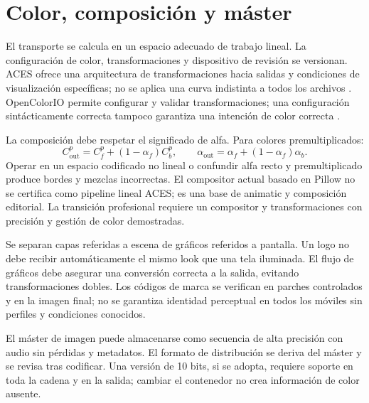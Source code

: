 \section{Color, composición y máster}
El transporte se calcula en un espacio adecuado de trabajo lineal. La configuración de color, transformaciones y dispositivo de revisión se versionan. ACES ofrece una arquitectura de transformaciones hacia salidas y condiciones de visualización específicas; no se aplica una curva indistinta a todos los archivos \cite{aces}. OpenColorIO permite configurar y validar transformaciones; una configuración sintácticamente correcta tampoco garantiza una intención de color correcta \cite{ocio}.

La composición debe respetar el significado de alfa. Para colores premultiplicados:
\begin{equation}
 C_{\mathrm{out}}^{p}=C_f^{p}+(1-\alpha_f)C_b^{p},\qquad
 \alpha_{\mathrm{out}}=\alpha_f+(1-\alpha_f)\alpha_b.
\end{equation}
Operar en un espacio codificado no lineal o confundir alfa recto y premultiplicado produce bordes y mezclas incorrectas. El compositor actual basado en Pillow no se certifica como pipeline lineal ACES; es una base de animatic y composición editorial. La transición profesional requiere un compositor y transformaciones con precisión y gestión de color demostradas.

Se separan capas referidas a escena de gráficos referidos a pantalla. Un logo no debe recibir automáticamente el mismo look que una tela iluminada. El flujo de gráficos debe asegurar una conversión correcta a la salida, evitando transformaciones dobles. Los códigos de marca se verifican en parches controlados y en la imagen final; no se garantiza identidad perceptual en todos los móviles sin perfiles y condiciones conocidos.

El máster de imagen puede almacenarse como secuencia de alta precisión con audio sin pérdidas y metadatos. El formato de distribución se deriva del máster y se revisa tras codificar. Una versión de 10 bits, si se adopta, requiere soporte en toda la cadena y en la salida; cambiar el contenedor no crea información de color ausente.

